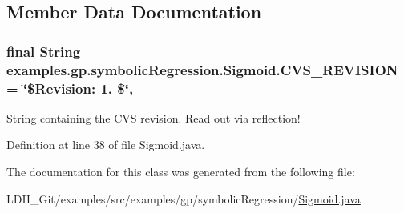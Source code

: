 \subsection{Member Data Documentation}
\hypertarget{classexamples_1_1gp_1_1symbolic_regression_1_1_sigmoid_ac6597457c3deea5310e5a3fb7a8520d7}{
\subsubsection[{C\-V\-S\-\_\-\-R\-E\-V\-I\-S\-I\-O\-N}]{\setlength{\rightskip}{0pt plus 5cm}final String examples.\-gp.\-symbolic\-Regression.\-Sigmoid.\-C\-V\-S\-\_\-\-R\-E\-V\-I\-S\-I\-O\-N = \char`\"{}\$Revision\-: 1. \$\char`\"{}\hspace{0.3cm}{\ttfamily [static]}, {\ttfamily [private]}}}\label{classexamples_1_1gp_1_1symbolic_regression_1_1_sigmoid_ac6597457c3deea5310e5a3fb7a8520d7}
String containing the C\-V\-S revision. Read out via reflection! 

Definition at line 38 of file Sigmoid.\-java.



The documentation for this class was generated from the following file\-:\begin{DoxyCompactItemize}
\item 
L\-D\-H\-\_\-\-Git/examples/src/examples/gp/symbolic\-Regression/\hyperlink{_sigmoid_8java}{Sigmoid.\-java}\end{DoxyCompactItemize}
